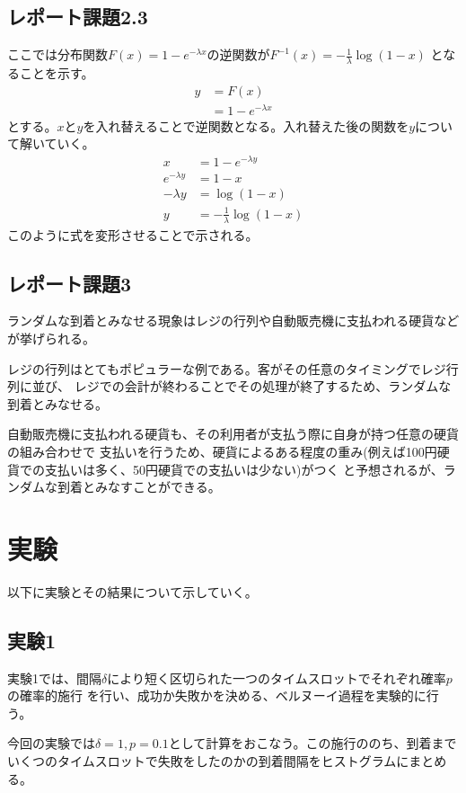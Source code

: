 \documentclass[a4paper,11pt,dvipdfmx]{jsarticle}
\begin{document}
\subsection{レポート課題2.3}
ここでは分布関数$F(x)=1-e^{-\lambda x}$の逆関数が$F^{-1}(x)=-\frac{1}{\lambda}\log(1-x)$
となることを示す。
\begin{align}
    y &= F(x) \\
      &= 1-e^{-\lambda x}
\end{align}
とする。$x$と$y$を入れ替えることで逆関数となる。入れ替えた後の関数を$y$について解いていく。
\begin{align}
    x &= 1 - e^{-\lambda y} \\
    e^{-\lambda y}  &= 1 - x \\
    -\lambda y &= \log(1-x) \\
    y &= -\frac{1}{\lambda}\log(1-x)
\end{align}
このように式を変形させることで示される。

\subsection{レポート課題3}
ランダムな到着とみなせる現象はレジの行列や自動販売機に支払われる硬貨などが挙げられる。

レジの行列はとてもポピュラーな例である。客がその任意のタイミングでレジ行列に並び、
レジでの会計が終わることでその処理が終了するため、ランダムな到着とみなせる。

自動販売機に支払われる硬貨も、その利用者が支払う際に自身が持つ任意の硬貨の組み合わせで
支払いを行うため、硬貨によるある程度の重み(例えば100円硬貨での支払いは多く、50円硬貨での支払いは少ない)がつく
と予想されるが、ランダムな到着とみなすことができる。

\section{実験}
以下に実験とその結果について示していく。

\subsection{実験1}
実験1では、間隔$\delta$により短く区切られた一つのタイムスロットでそれぞれ確率$p$の確率的施行
を行い、成功か失敗かを決める、ベルヌーイ過程を実験的に行う。

今回の実験では$\delta=1,p=0.1$として計算をおこなう。この施行ののち、到着まで
いくつのタイムスロットで失敗をしたのかの到着間隔をヒストグラムにまとめる。
\end{document}
